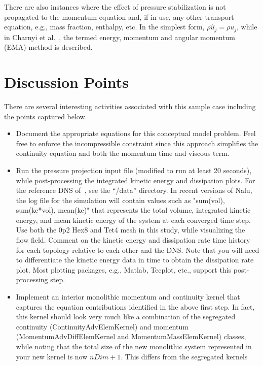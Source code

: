 \documentclass{article}
\begin{document}
There are also instances where the effect of pressure stabilization is not propagated to the momentum equation and, if in use, any other transport equation, e.g.,
mass fraction, enthalpy, etc. In the simplest form, $\rho \hat{u}_j = \rho u_j$, while in Charnyi et al.~\cite{charnyi2017}, the termed energy, momentum and angular momentum (EMA) method is described. 

\section{Discussion Points}

There are several interesting activities associated with this sample case including
the points captured below. 

\begin{itemize}
	\item Document the appropriate equations for this conceptual model problem. Feel free to enforce the incompressible
          	constraint since this approach simplifies the continuity equation and both the momentum time and viscous term.
	\item Run the pressure projection input file (modified to run at least 20 seconds), while post-processing the integrated 
		kinetic energy and dissipation plots. For the reference DNS of~\cite{hillewaert2012}, see the ``/data''  directory. In recent versions of Nalu, the 
		log file for the simulation will contain values such as "sum(vol), sum(ke*vol), mean(ke)" that represents the total volume, integrated kinetic energy, 
		and mean kinetic energy of the system at each converged time step. Use both the 0p2 Hex8 and Tet4 mesh in this study, while visualizing the flow field.
		Comment on the kinetic energy and dissipation rate time history for each topology relative to each other and the DNS. Note that you will need to 
		differentiate the kinetic energy data in time to obtain the dissipation rate plot. Most plotting packages, e.g., Matlab, Tecplot, etc., support this post-processing step.
        \item Implement an interior monolithic momentum and continuity kernel that captures the equation contributions identified 
        		in the above first step. In fact, this kernel should look very much like a combination of the segregated continuity (ContinuityAdvElemKernel) 
          	and momentum (MomentumAdvDiffElemKernel and MomentumMassElemKernel) classes, while noting that the total 
		size of the new monolithic system represented in your new kernel is now $nDim+1$. This differs from the segregated kernels 

\end{itemize}
\end{document}
